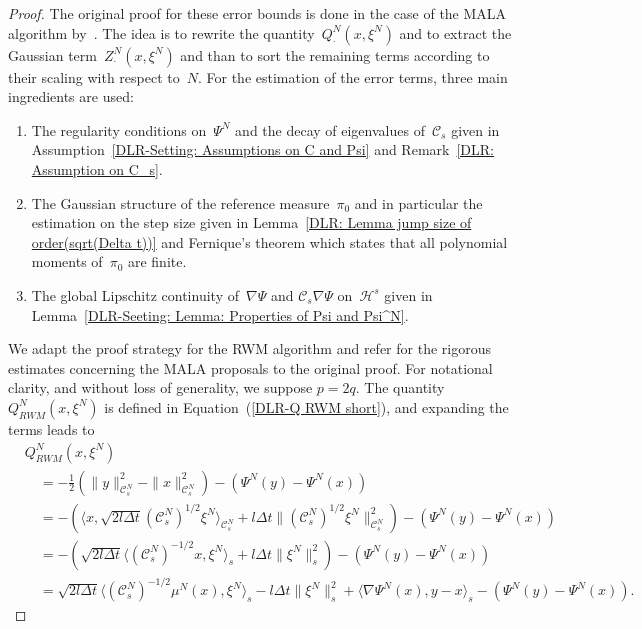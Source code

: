 \begin{proof}
 The original proof for these error bounds is done in the case of  the MALA algorithm by~\autocite[Lemma 4.4]{Pillai2012}. The idea is to rewrite the quantity~$Q^N_{\cdot} (x,  \xi^N)$ and to extract the Gaussian term~$Z^N_{\cdot} (x, \xi^N)$ and than to sort the remaining terms according to their scaling with respect to~$N$. For the estimation of the error terms, three main ingredients are used:
 \begin{enumerate}
  \item The regularity conditions on~$\Psi^N$ and the decay of eigenvalues of~$\mathcal{C}_s$ given in Assumption~\ref{DLR-Setting: Assumptions on C and Psi} and Remark~\ref{DLR: Assumption on C_s}.
  \item The Gaussian structure of the reference measure~$\pi_0$ and in particular the estimation on the step size given in Lemma~\ref{DLR: Lemma jump size of order(sqrt(Delta t))} and Fernique's theorem which states that all polynomial moments of~$\pi_0$ are finite.
  \item The global Lipschitz continuity of~$\nabla \Psi$ and $\mathcal{C}_s \nabla \Psi$ on~$\mathcal{H}^s$ given in Lemma~\ref{DLR-Seeting: Lemma: Properties of Psi and Psi^N}.
 \end{enumerate}
 We adapt the proof strategy for the RWM algorithm and refer for the rigorous estimates concerning the MALA proposals to the original proof.  For notational clarity, and without loss of generality, we suppose $p=2q$. The quantity~$Q^N_{RWM} (x,  \xi^N)$ is defined in Equation~(\ref{DLR-Q RWM short}), and expanding the terms leads to
\begin{align*}
 &  Q^N_{RWM} (x,  \xi^N) \\
  & \quad = - \frac{1}{2} (\|y\|_{\mathcal{C}^N_s}^2 - \|x\|_{\mathcal{C}^N_s}^2) - (\Psi^N(y) - \Psi^N(x)) \\
  & \quad = -  \left( \langle x, \sqrt{2l \Delta t} (\mathcal{C}^N_s)^{1/2} \xi^N \rangle_{\mathcal{C}^N_s} + l \Delta t \|(\mathcal{C}^N_s)^{1/2} \xi^N\|_{\mathcal{C}^N_s}^2 \right) - (\Psi^N(y) - \Psi^N(x)) \\
  & \quad = -  \left( \sqrt{2l \Delta t} \langle (\mathcal{C}^N_s)^{-1/2} x,   \xi^N \rangle_{s} + l \Delta t \| \xi^N\|_{s}^2 \right) - (\Psi^N(y) - \Psi^N(x)) \\
  & \quad =\sqrt{2l \Delta t} \langle (\mathcal{C}^N_s)^{-1/2} \mu^N(x) , \xi^N \rangle_s  - l \Delta t \| \xi^N\|_{s}^2 + \langle \nabla \Psi^N(x), y - x\rangle_s  - (\Psi^N(y) - \Psi^N(x)).
\end{align*}

\end{proof}
